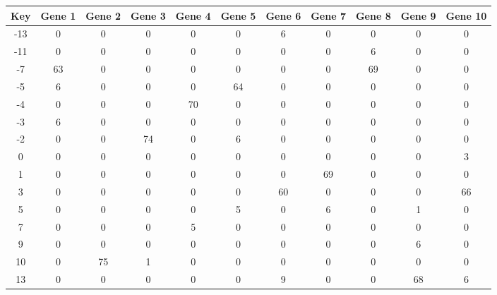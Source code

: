 \begin{tabular}{|c|c|c|c|c|c|c|c|c|c|c|}
\hline
Key & Gene 1 & Gene 2 & Gene 3 & Gene 4 & Gene 5 & Gene 6 & Gene 7 & Gene 8 & Gene 9 & Gene 10 \\
\hline
-13 & 0 & 0 & 0 & 0 & 0 & 6 & 0 & 0 & 0 & 0 \\
-11 & 0 & 0 & 0 & 0 & 0 & 0 & 0 & 6 & 0 & 0 \\
-7 & 63 & 0 & 0 & 0 & 0 & 0 & 0 & 69 & 0 & 0 \\
-5 & 6 & 0 & 0 & 0 & 64 & 0 & 0 & 0 & 0 & 0 \\
-4 & 0 & 0 & 0 & 70 & 0 & 0 & 0 & 0 & 0 & 0 \\
-3 & 6 & 0 & 0 & 0 & 0 & 0 & 0 & 0 & 0 & 0 \\
-2 & 0 & 0 & 74 & 0 & 6 & 0 & 0 & 0 & 0 & 0 \\
0 & 0 & 0 & 0 & 0 & 0 & 0 & 0 & 0 & 0 & 3 \\
1 & 0 & 0 & 0 & 0 & 0 & 0 & 69 & 0 & 0 & 0 \\
3 & 0 & 0 & 0 & 0 & 0 & 60 & 0 & 0 & 0 & 66 \\
5 & 0 & 0 & 0 & 0 & 5 & 0 & 6 & 0 & 1 & 0 \\
7 & 0 & 0 & 0 & 5 & 0 & 0 & 0 & 0 & 0 & 0 \\
9 & 0 & 0 & 0 & 0 & 0 & 0 & 0 & 0 & 6 & 0 \\
10 & 0 & 75 & 1 & 0 & 0 & 0 & 0 & 0 & 0 & 0 \\
13 & 0 & 0 & 0 & 0 & 0 & 9 & 0 & 0 & 68 & 6 \\
\hline
\end{tabular}